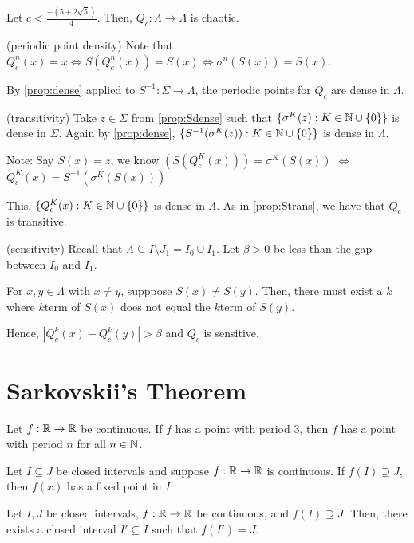 \documentclass[class=pmath370,tikz,notes]{agony}
\begin{document}
\begin{theorem}
  Let $c < \frac{-(5+2\sqrt{5})}{4}$.
  Then, $Q_c: \Lambda \to \Lambda$ is chaotic.
\end{theorem}
\begin{prf}
  (periodic point density)
  Note that $Q_c^n(x)=x \iff S(Q_c^n(x)) = S(x) \iff \sigma^n(S(x)) = S(x)$.

  By \cref{prop:dense} applied to $S^{-1}: \Sigma \to \Lambda$,
  the periodic points for $Q_c$ are dense in $\Lambda$.

  (transitivity)
  Take $z \in \Sigma$ from \cref{prop:Sdense}
  such that $\{\sigma^K(z): K \in \mathbb{N} \cup \{0\}\}$ is dense in $\Sigma$.
  Again by \cref{prop:dense}, $\{S^{-1}(\sigma^K(z)): K \in \mathbb{N} \cup \{0\}\}$
  is dense in $\Lambda$.

  Note: Say $S(x)=z$, we know $(S(Q_c^K(x))) = \sigma^K(S(x))$ $\iff$ $Q_c^K(x) = S^{-1}(\sigma^K(S(x)))$

  This, $\{Q_c^K(x): K \in \mathbb{N} \cup \{0\}\}$ is dense in $\Lambda$.
  As in \cref{prop:Strans}, we have that $Q_c$ is transitive.

  (sensitivity)
  Recall that $\Lambda \subseteq I \setminus J_1 = I_0 \cup I_1$.
  Let $\beta > 0$ be less than the gap between $I_0$ and $I_1$.

  For $x, y \in \Lambda$ with $x \neq y$, supppose $S(x) \neq S(y)$.
  Then, there must exist a $k$ where $k$\xth term of $S(x)$
  does not equal the $k$\xth term of $S(y)$.

  Hence, $|Q_c^k(x) - Q_c^k(y)| > \beta$ and $Q_c$ is sensitive.
\end{prf}

\chapter{Sarkovskii's Theorem}
\begin{theorem}[period 3]\label{thm:p3}
  Let $f: \mathbb{R} \to \mathbb{R}$ be continuous.
  If $f$ has a point with period 3,
  then $f$ has a point with period $n$ for all $n \in \mathbb{N}$.
\end{theorem}

\begin{prop}\label{prop:1}
  Let $I \subseteq J$ be closed intervals and suppose $f: \mathbb{R} \to \mathbb{R}$ is continuous.
  If $f(I) \supseteq J$, then $f(x)$ has a fixed point in $I$.
\end{prop}

\begin{prop}\label{prop:2}
  Let $I, J$ be closed intervals, $f: \mathbb{R} \to \mathbb{R}$ be continuous, and $f(I) \supseteq J$.
  Then, there exists a closed interval $I' \subseteq I$ such that $f(I') = J$.
\end{prop}
\end{document}
